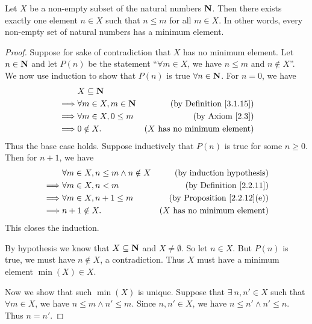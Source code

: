 \begin{proposition}\label{8.1.4}
    Let \(X\) be a non-empty subset of the natural numbers \(\mathbf{N}\).
    Then there exists exactly one element \(n \in X\) such that \(n \leq m\) for all \(m \in X\).
    In other words, every non-empty set of natural numbers has a minimum element.
\end{proposition}

\begin{proof}
    Suppose for sake of contradiction that \(X\) has no minimum element.
    Let \(n \in \mathbf{N}\) and let \(P(n)\) be the statement ``\(\forall m \in X\), we have \(n \leq m\) and \(n \notin X\)''.
    We now use induction to show that \(P(n)\) is true \(\forall n \in \mathbf{N}\).
    For \(n = 0\), we have
    \begin{align*}
                 & X \subseteq \mathbf{N}                                                    \\
        \implies & \forall m \in X, m \in \mathbf{N} & \text{(by Definition \ref{3.1.15})}   \\
        \implies & \forall m \in X, 0 \leq m & \text{(by Axiom \ref{2.3})}           \\
        \implies & 0 \notin X.               & \text{(\(X\) has no minimum element)}
    \end{align*}
    Thus the base case holds.
    Suppose inductively that \(P(n)\) is true for some \(n \geq 0\).
    Then for \(n + 1\), we have
    \begin{align*}
                 & \forall m \in X, n \leq m \land n \notin X & \text{(by induction hypothesis)}        \\
        \implies & \forall m \in X, n < m                     & \text{(by Definition \ref{2.2.11})}     \\
        \implies & \forall m \in X, n + 1 \leq m              & \text{(by Proposition \ref{2.2.12}(e))} \\
        \implies & n + 1 \notin X.                            & \text{(\(X\) has no minimum element)}
    \end{align*}
    This closes the induction.

    By hypothesis we know that \(X \subseteq \mathbf{N}\) and \(X \neq \emptyset\).
    So let \(n \in X\).
    But \(P(n)\) is true, we must have \(n \notin X\), a contradiction.
    Thus \(X\) must have a minimum element \(\min(X) \in X\).

    Now we show that such \(\min(X)\) is unique.
    Suppose that \(\exists\ n, n' \in X\) such that \(\forall m \in X\), we have \(n \leq m \land n' \leq m\).
    Since \(n, n' \in X\), we have \(n \leq n' \land n' \leq n\).
    Thus \(n = n'\).
\end{proof}

